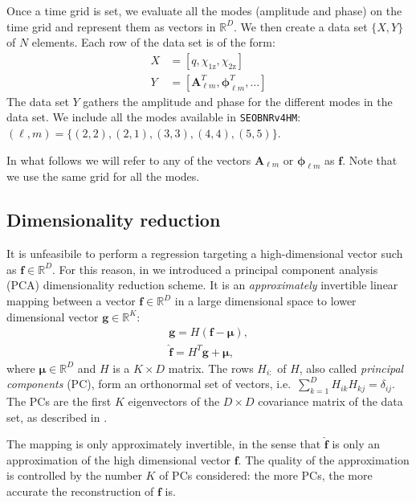 \documentclass[twocolumn,showpacs,preprintnumbers,nofootinbib,prd,
superscriptaddress,10pt]{revtex4-1}
\newcommand{\R}{\mathbb{R}}
\begin{document}
Once a time grid is set, we evaluate all the modes (amplitude and phase) on the time grid and represent them as vectors in $\R^D$.
We then create a data set $\{X, Y\}$ of $N$ elements. Each row of the data set is of the form:
\begin{align}
	X &= [q, \chi_\text{1z}, \chi_\text{2z}] \\
	Y &= [\boldsymbol{A}^T_{\ell m}, \boldsymbol{\phi}^T_{\ell m}, \hdots ] 
\end{align}
%
The data set $Y$ gathers the amplitude and phase for the different modes in the data set.
We include all the modes available in \texttt{SEOBNRv4HM}: $(\ell, m) = \{(2,2),(2,1), (3,3), (4,4), (5,5)\}$.

In what follows we will refer to any of the vectors $\boldsymbol{A}_{\ell m}$ or $\boldsymbol{\phi}_{\ell m}$ as $\boldsymbol{f}$.
Note that we use the same grid for all the modes.

\subsection{Dimensionality reduction}
\label{sec:PCA}

It is unfeasibile to perform a regression targeting a high-dimensional vector such as $\boldsymbol{f} \in \R^D$. 
For this reason, in \cite{Schmidt:2020yuu} we introduced a principal component analysis (PCA) dimensionality 
reduction scheme.
It is an {\it approximately} invertible linear mapping between a vector $\boldsymbol{f} \in \R^D$ in a large dimensional space to lower dimensional vector  $\boldsymbol{g} \in \R^K$:
%
\begin{align}
	\mathbf{g} = H (\mathbf{f} - \boldsymbol{\mu}) \label{eq:PCA_reduction_model},\\
	\hat{\mathbf{f}} = H^T \mathbf{g} + \boldsymbol{\mu}, \label{eq:PCA_reconstruction_model}
\end{align}
where $\boldsymbol{\mu} \in \R^D$ and $H$ is a $K \times D$ matrix.
The rows $H_{i:}$ of $H$, also called {\it principal components} (PC), form an orthonormal set of vectors, 
i.e.~${\sum_{k=1}^D H_{ik} H_{kj} = \delta_{ij}}$.
The PCs are the first $K$ eigenvectors of the $D \times D$ covariance matrix of the data set, as described in 
\cite[Sec. 12]{murphy2012machine}.

The mapping is only approximately invertible, in the sense that $\hat{\mathbf{f}}$ is only an approximation of the high dimensional vector $\mathbf{f}$. The quality of the approximation is controlled by the number $K$ of PCs considered: the more PCs, the more accurate the reconstruction of $\mathbf{f}$ is.
\end{document}
